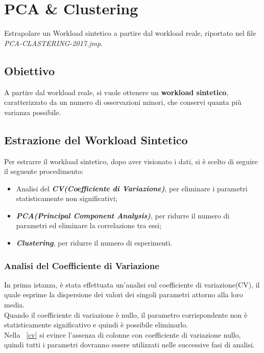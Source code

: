 
\chapter{PCA \& Clustering}
Estrapolare un Workload sintetico a partire dal workload reale, riportato nel file
 \textit{PCA-CLASTERING-2017.jmp}.

\section{Obiettivo}
A partire dal workload reale, si vuole ottenere un \textbf{workload sintetico},
caratterizzato da un numero di osservazioni minori, che conservi quanta
più varianza possibile.

\section{Estrazione del Workload Sintetico}
Per estrarre il workload sintetico, dopo aver visionato i dati, si è scelto
di seguire il seguente procedimento:

\begin{itemize}
  \item Analisi del \textbf{\textit{CV(Coefficiente di Variazione)}}, per
  eliminare i parametri statisticamente non significativi;
  \item \textbf{\textit{PCA(Principal Component Analysis)}}, per ridurre il
  numero di parametri ed eliminare la correlazione tra essi;
  \item \textbf{\textit{Clustering}}, per ridurre il numero di esperimenti.
\end{itemize}


\subsection{Analisi del Coefficiente di Variazione}
In prima istanza, è stata effettuata un'analisi sul coefficiente di variazione(CV),
il quale esprime la dispersione dei valori dei singoli parametri attorno alla loro media.\\
Quando il coefficiente di variazione è nullo, il parametro
corrispondente non è statisticamente significativo e quindi è possibile eliminarlo.\\
Nella \figurename~\ref{cv} si evince l'assenza di colonne con coefficiente di variazione nullo,
quindi tutti i parametri dovranno essere utilizzati nelle successive fasi di analisi.

